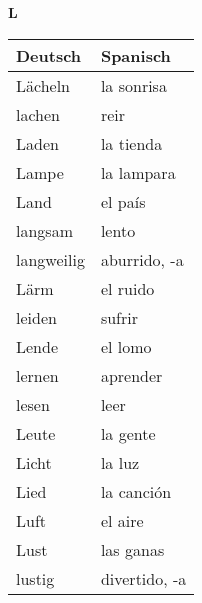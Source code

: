 \begin{flushright}\begin{Huge}\textbf{L}\end{Huge}\end{flushright}

\begin{longtable}{p{} p{}} 
\textbf{Deutsch}     & \textbf{Spanisch}                                       \\ \hline
\hline
\endhead %
Lächeln & la sonrisa\\
lachen & reir\\
Laden & la tienda\\
Lampe & la lampara\\
Land & el país\\
langsam & lento \\
langweilig & aburrido, -a\\
Lärm & el ruido \\
leiden & sufrir\\
Lende & el lomo\\
lernen & aprender\\
lesen & leer \\
Leute & la gente\\
Licht & la luz\\
Lied & la canción\\
Luft & el aire\\
Lust & las ganas\\
lustig & divertido, -a\\
\end{longtable}
